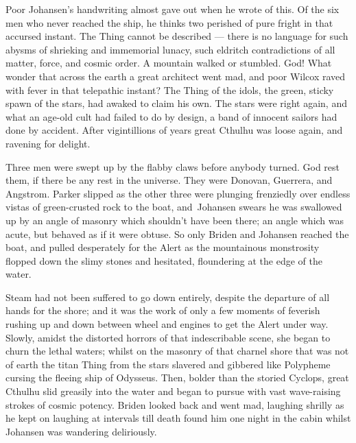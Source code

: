 Poor Johansen's handwriting almost gave out when he wrote of this. Of
the six men who never reached the ship, he thinks two perished of pure
fright in that accursed instant. The Thing cannot be described --- there
is no language for such abysms of shrieking and immemorial lunacy, such
eldritch contradictions of all matter, force, and cosmic order. A
mountain walked or stumbled. God! What wonder that across the earth a
great architect went mad, and poor Wilcox raved with fever in that
telepathic instant? The Thing of the idols, the green, sticky spawn of
the stars, had awaked to claim his own. The stars were right again, and
what an age-old cult had failed to do by design, a band of innocent
sailors had done by accident. After vigintillions of years great Cthulhu
was loose again, and ravening for delight.

Three men were swept up by the flabby claws before anybody turned. God
rest them, if there be any rest in the universe. They were Donovan,
Guerrera, and Angstrom. Parker slipped as the other three were plunging
frenziedly over endless vistas of green-crusted rock to the boat, and\est\
Johansen swears he was swallowed up by an angle of masonry which
shouldn't have been there; an angle which was acute, but behaved as if
it were obtuse. So only Briden and Johansen reached the boat, and pulled
desperately for the Alert as the mountainous monstrosity flopped down
the slimy stones and hesitated, floundering at the edge of the water.

Steam had not been suffered to go down entirely, despite the departure
of all hands for the shore; and it was the work of only a few moments of
feverish rushing up and down between wheel and engines to get the Alert
under way. Slowly, amidst the distorted horrors of that indescribable
scene, she began to churn the lethal waters; whilst on the masonry of
that charnel shore that was not of earth the titan Thing from the stars
slavered and gibbered like Polypheme cursing the fleeing ship of
Odysseus. Then, bolder than the storied Cyclops, great Cthulhu slid
greasily into the water and began to pursue with vast wave-raising
strokes of cosmic potency. Briden looked back and went mad, laughing
shrilly as he kept on laughing at intervals till death found him one
night in the cabin whilst Johansen was wandering deliriously.

